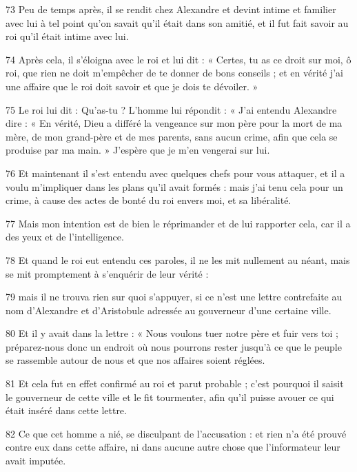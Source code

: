 \par 73 Peu de temps après, il se rendit chez Alexandre et devint intime et familier avec lui à tel point qu'on savait qu'il était dans son amitié, et il fut fait savoir au roi qu'il était intime avec lui.

\par 74 Après cela, il s'éloigna avec le roi et lui dit : « Certes, tu as ce droit sur moi, ô roi, que rien ne doit m'empêcher de te donner de bons conseils ; et en vérité j'ai une affaire que le roi doit savoir et que je dois te dévoiler. »

\par 75 Le roi lui dit : Qu'as-tu ? L'homme lui répondit : « J'ai entendu Alexandre dire : « En vérité, Dieu a différé la vengeance sur mon père pour la mort de ma mère, de mon grand-père et de mes parents, sans aucun crime, afin que cela se produise par ma main. » J'espère que je m'en vengerai sur lui.

\par 76 Et maintenant il s'est entendu avec quelques chefs pour vous attaquer, et il a voulu m'impliquer dans les plans qu'il avait formés : mais j'ai tenu cela pour un crime, à cause des actes de bonté du roi envers moi, et sa libéralité.

\par 77 Mais mon intention est de bien le réprimander et de lui rapporter cela, car il a des yeux et de l'intelligence.

\par 78 Et quand le roi eut entendu ces paroles, il ne les mit nullement au néant, mais se mit promptement à s'enquérir de leur vérité :

\par 79 mais il ne trouva rien sur quoi s'appuyer, si ce n'est une lettre contrefaite au nom d'Alexandre et d'Aristobule adressée au gouverneur d'une certaine ville.

\par 80 Et il y avait dans la lettre : « Nous voulons tuer notre père et fuir vers toi ; préparez-nous donc un endroit où nous pourrons rester jusqu'à ce que le peuple se rassemble autour de nous et que nos affaires soient réglées.

\par 81 Et cela fut en effet confirmé au roi et parut probable ; c'est pourquoi il saisit le gouverneur de cette ville et le fit tourmenter, afin qu'il puisse avouer ce qui était inséré dans cette lettre.

\par 82 Ce que cet homme a nié, se disculpant de l'accusation : et rien n'a été prouvé contre eux dans cette affaire, ni dans aucune autre chose que l'informateur leur avait imputée.

